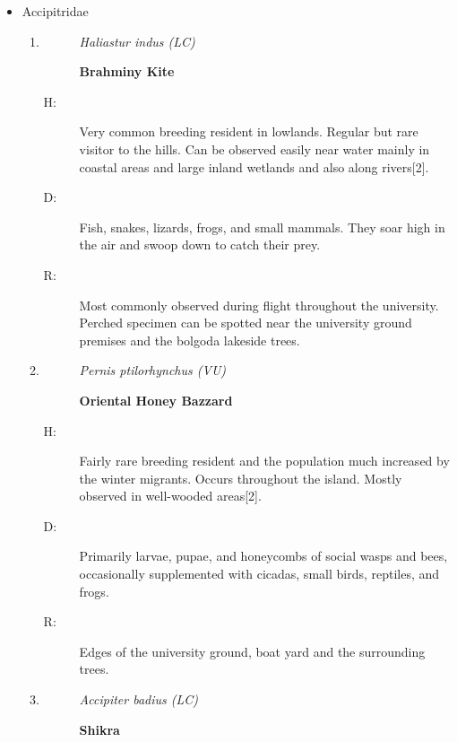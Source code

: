 \begin{itemize}%
\item%
 Accipitridae%
\begin{enumerate}%
\item%
\begin{description}%
\item[]%
\textit{Haliastur indus (LC)}%
\item[]%
\textbf{Brahminy Kite}%
\end{description}%
\begin{description}%
\item[H: ]%
Very common breeding resident in lowlands. Regular but rare visitor to the hills. Can be observed easily near water mainly in coastal areas and large inland wetlands and also along rivers{[}2{]}.%
\item[D: ]%
Fish, snakes, lizards, frogs, and small mammals. They soar high in the air and swoop down to catch their prey.%
\item[R: ]%
Most commonly observed during flight throughout the university. Perched specimen can be spotted near the university ground premises and the bolgoda lakeside trees.%
\end{description}%
\item%
\begin{description}%
\item[]%
\textit{Pernis ptilorhynchus (VU)}%
\item[]%
\textbf{Oriental Honey Bazzard}%
\end{description}%
\begin{description}%
\item[H: ]%
Fairly rare breeding resident and the population much increased by the winter migrants. Occurs throughout the island. Mostly observed in well{-}wooded areas{[}2{]}.%
\item[D: ]%
Primarily larvae, pupae, and honeycombs of social wasps and bees, occasionally supplemented with cicadas, small birds, reptiles, and frogs.%
\item[R: ]%
Edges of the university ground, boat yard and the surrounding trees.%
\end{description}%
\item%
\begin{description}%
\item[]%
\textit{Accipiter badius (LC)}%
\item[]%
\textbf{Shikra}%
\end{description}%
\begin{description}%

\end{description}
\end{enumerate}
\end{itemize}

